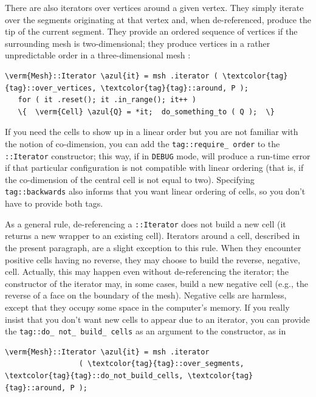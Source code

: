 There are also iterators over vertices around a given vertex.
They simply iterate over the segments originating at that vertex and,
when de-referenced, produce the tip of the current segment.
They provide an ordered sequence of vertices if the surrounding mesh is two-dimensional;
they produce vertices in a rather unpredictable order in a three-dimensional mesh :

\begin{Verbatim}[commandchars=\\\{\},formatcom=\small\tt,
   baselinestretch=0.94,framesep=2mm                      ]
   \verm{Mesh}::Iterator \azul{it} = msh .iterator ( \textcolor{tag}{tag}::over_vertices, \textcolor{tag}{tag}::around, P );
   for ( it .reset(); it .in_range(); it++ )
   \{  \verm{Cell} \azul{Q} = *it;  do_something_to ( Q );  \}
\end{Verbatim}

If you need the cells to show up in a linear order but you are not familiar
with the notion of co-dimension, you can add the {\small\tt\textcolor{tag}{tag}::require\_\,order}
to the {\small\tt{}::Iterator} constructor;
this way, if in {\small\tt DEBUG} mode, {\maniFEM} will produce a run-time error
if that particular configuration is not compatible with linear ordering
(that is, if the co-dimension of the central cell is not equal to two).
Specifying {\small\tt\textcolor{tag}{tag}::backwards} also informs {\maniFEM} that you want
linear ordering of cells, so you don't have to provide both tags.

As a general rule, de-referencing a {\small\tt{}::Iterator} does not build a new
cell (it returns a new wrapper to an existing cell).
Iterators around a cell, described in the present paragraph, are a slight exception to this
rule.
When they encounter positive cells having no reverse, they may choose to build the reverse,
negative, cell.
Actually, this may happen even without de-referencing the iterator;
the constructor of the iterator may, in some cases, build a new negative cell
(e.g., the reverse of a face on the boundary of the mesh).
Negative cells are harmless, except that they occupy some space in the computer's memory.
If you really insist that you don't want new cells to appear due to an iterator,
you can provide the {\small\tt\textcolor{tag}{tag}::do\_\,not\_\,build\_\,cells} as an argument
to the constructor, as in

\begin{Verbatim}[commandchars=\\\{\},formatcom=\small\tt,
   baselinestretch=0.94,framesep=2mm                      ]
   \verm{Mesh}::Iterator \azul{it} = msh .iterator
                 ( \textcolor{tag}{tag}::over_segments, \textcolor{tag}{tag}::do_not_build_cells, \textcolor{tag}{tag}::around, P );
\end{Verbatim}


